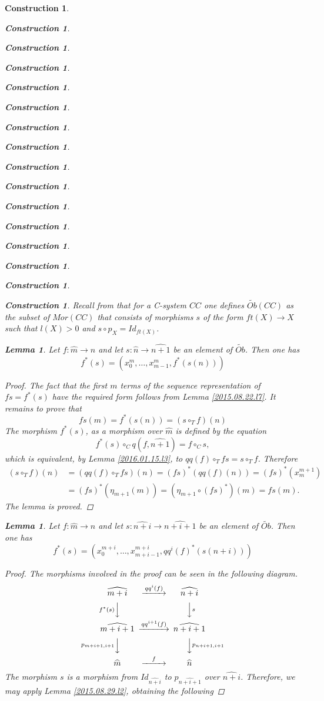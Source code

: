 \documentclass[12pt]{amsart}
\newtheorem{lemma}[proposition]{Lemma}
\numberwithin{proposition}{subsection}
\newtheorem{construction}[proposition]{Construction}
\newcommand{\llabel}[1]{\label{#1}}
\newcommand{\sr}{\rightarrow}
\newcommand{\wt}{\widetilde}
\newcommand{\wh}{\widehat}
\newcommand{\mbind}[1]{{#1^*}}
\newcommand{\hc}{\circ_{T}}
\begin{document}
\begin{construction}
\begin{construction}
\begin{construction}
\begin{construction}
\begin{construction}
\begin{construction}
\begin{construction}
\begin{construction}
\begin{construction}
\begin{construction}
\begin{construction}
\begin{construction}
\begin{construction}
\begin{construction}
\begin{construction}
\begin{construction}
Recall from \cite{Csubsystems} that for a C-system $CC$ one defines
$\wt{Ob}(CC)$ as the subset of $Mor(CC)$ that consists of morphisms $s$ of the
form $ft(X)\sr X$ such that $l(X)>0$ and $s\circ p_X=Id_{ft(X)}$.
%
\begin{lemma}
\llabel{2015.08.24.l1}
Let $f:\wh{m}\sr\wh{n}$ and let $s:\wh{n}\sr\wh{n+1}$ be an element of $\wt{Ob}$. Then one has
%
$$f^*(s)=(x_0^m,\dots,x_{m-1}^m,\mbind{f}(s(n)))$$
%
\end{lemma}
%
\begin{proof}
The fact that the first $m$ terms of the sequence representation of $fs=f^*(s)$
have the required form follows from Lemma \ref{2015.08.22.l7}. It remains to
prove that
%
$$fs(m)=\mbind{f}(s(n))=(s\hc f)(n)$$
%
The morphism $f^*(s)$, as a morphism over $\wh{m}$ is defined by the equation
%
$$f^*(s)\circ_C q(f,\wh{n+1})=f\circ_C s,$$
%
which is equivalent, by Lemma \ref{2016.01.15.l3},  to $qq(f)\hc fs=s\hc f$. Therefore 
%
\begin{equation*}
  \begin{split}
    (s\hc f)(n)&=(qq(f)\hc fs)(n)=\mbind{(fs)}(qq(f)(n))=\mbind{(fs)}(x_m^{m+1})
    \\&
    = \mbind{(fs)}(\eta_{m+1}(m))
    = (\eta_{m+1}\circ\mbind{(fs)})(m)=fs(m).
  \end{split}
\end{equation*}
%
The lemma is proved.
\end{proof}
%
\begin{lemma}
\llabel{2015.08.29.l1}
Let $f:\wh{m}\sr\wh{n}$ and let $s:\wh{n+i}\sr\wh{n+i+1}$ be an element of $\wt{Ob}$. Then one has
%
\begin{equation}\llabel{2015.08.29.eq1}
f^*(s)=(x_0^{m+i},\dots,x_{m+i-1}^{m+i},\mbind{qq^i(f)}(s(n+i)))
\end{equation}%
%
\end{lemma}
%
\begin{proof}
The morphisms involved in the proof can be seen in the following diagram.
%
$$
\begin{CD}
\wh{m+i} @>qq^i(f)>> \wh{n+i}\\
@Vf^*(s)VV @VVsV\\
\wh{m+i+1} @>qq^{i+1}(f)>> \wh{n+i+1}\\
@Vp_{m+i+1,i+1}VV @VVp_{n+i+1,i+1}V\\
\wh{m} @>f>> \wh{n}
\end{CD}
$$
%
The morphism $s$ is a morphism from $Id_{\wh{n+i}}$ to $p_{\wh{n+i+1}}$ over
$\wh{n+i}$. Therefore, we may apply Lemma \ref{2015.08.29.l2}, obtaining the following

\end{proof}
\end{construction}
\end{construction}
\end{construction}
\end{construction}
\end{construction}
\end{construction}
\end{construction}
\end{construction}
\end{construction}
\end{construction}
\end{construction}
\end{construction}
\end{construction}
\end{construction}
\end{construction}
\end{construction}
\end{document}
